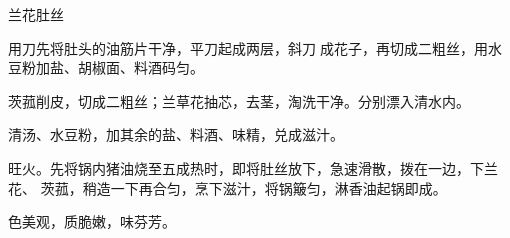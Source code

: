 %
%
%
%
%
%
%
\begin{recipe}{兰花肚丝}

\ingredients


\preparation

\step 用刀先将肚头的油筋片干净，平刀起成两层，斜刀𠟤成花子，再切成二粗丝，用水
豆粉加盐、胡椒面、料酒码匀。

\step 茨菰削皮，切成二粗丝；兰草花抽芯，去茎，淘洗干净。分别漂入清水内。

\step 清汤、水豆粉，加其余的盐、料酒、味精，兑成滋汁。

\step 旺火。先将锅内猪油烧至五成热时，即将肚丝放下，急速滑散，拨在一边，下兰花、
茨菰，稍造一下再合匀，烹下滋汁，将锅簸匀，淋香油起锅即成。

\features

色美观，质脆嫩，味芬芳。

\end{recipe}

